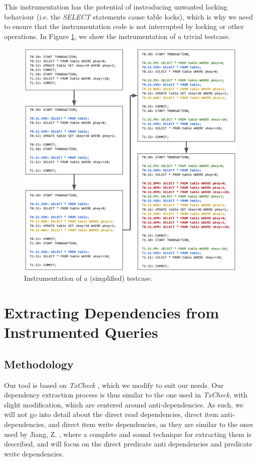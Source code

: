 This instrumentation has the potential of instroducing unwanted locking behaviour (i.e. the \textit{SELECT} statements cause table locks), which is why we need to ensure that the instrumentation code is not interrupted by locking or other operations. In Figure \ref{fig:sql_instrumentation_sample}, we show the instrumentation of a trivial testcase.

\begin{figure}[!h]
    \centering
    \includegraphics[width=\linewidth]{assets/sql_instrumentation_sample.png}
    \caption{Instrumentation of a (simplified) testcase.}
    \label{fig:sql_instrumentation_sample}
\end{figure}



\section{Extracting Dependencies from Instrumented Queries}

\subsection{Methodology}

Our tool is based on \textit{TxCheck} \cite{jiang2023detecting}, which we modify to suit our needs. Our dependency extraction process is thus similar to the one used in \textit{TxCheck}, with slight modification, which are centered around anti-dependencies. As such, we will not go into detail about the direct read dependencies, direct item anti-dependencies, and direct item write dependencies, as they are similar to the ones used by Jiang, Z. \cite{jiang2023detecting}, where a complete and sound technique for extracting them is described, and will focus on the direct predicate anti dependencies and predicate write dependencies.

